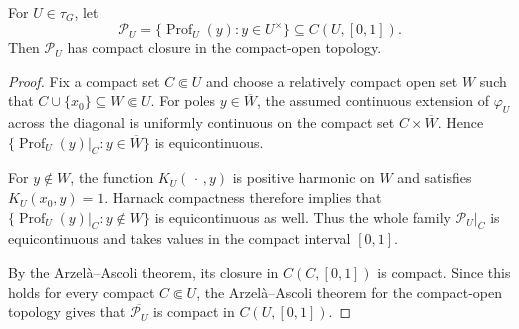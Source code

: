 \documentclass[10pt,a4paper]{amsart}
\begin{document}
\begin{lemma}
	\label{lem:martin-profile-compactness}
	For $U\in\tau_G$, let
	$$
	\mathcal P_U
	=
	\{\operatorname{Prof}_U(y):y\in U^\times\}
	\subseteq C(U,[0,1]).
	$$
	Then $\mathcal P_U$ has compact closure in the compact-open topology.
\end{lemma}

\begin{proof}
	Fix a compact set $C\Subset U$ and choose a relatively compact open
	set $W$ such that $C\cup\{x_0\}\subseteq W\Subset U$. For poles $y\in\overline W$, the assumed continuous extension of
	$\varphi_U$ across the diagonal is uniformly continuous on the compact
	set $C\times\overline W$. Hence $\{\operatorname{Prof}_U(y)|_C:y\in\overline W\}$ is equicontinuous.
	
	For $y\notin W$, the function $K_U(\,\cdot\,,y)$ is positive harmonic
	on $W$ and satisfies $K_U(x_0,y)=1$. Harnack compactness therefore
	implies that
	$\{\operatorname{Prof}_U(y)|_C:y\notin W\}$
	is equicontinuous as well. Thus the whole family
	$\mathcal P_U|_C$ is equicontinuous and takes values in the compact
	interval $[0,1]$.
	
	By the Arzel\`a--Ascoli theorem, its closure in $C(C,[0,1])$ is compact.
	Since this holds for every compact $C\Subset U$, the Arzel\`a--Ascoli
	theorem for the compact-open topology gives that
	$\overline{\mathcal P_U}$ is compact in $C(U,[0,1])$.
\end{proof}
\end{document}
